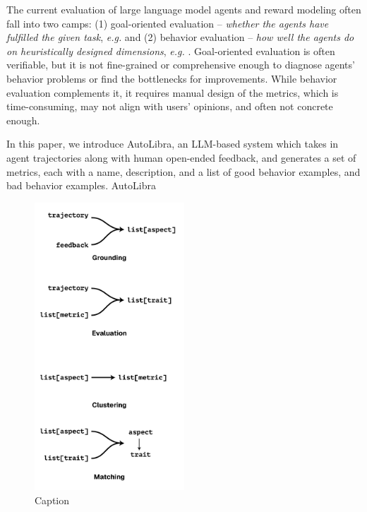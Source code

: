\documentclass{article} %
\begin{document}
The current evaluation of large language model agents and reward modeling often fall into two camps: (1) goal-oriented evaluation -- \emph{whether the agents have fulfilled the given task}, \emph{e.g.} \citet{zhouwebarena,jimenezswe,chan2024mle,paglieri2024balrog} and (2) behavior evaluation -- \emph{how well the agents do on heuristically designed dimensions}, \emph{e.g.} \citet{zhousotopia,shao2024collaborative,pan2025why}. 
Goal-oriented evaluation is often verifiable, but it is not fine-grained or comprehensive enough to diagnose agents' behavior problems or find the bottlenecks for improvements. 
While behavior evaluation complements it, it requires manual design of the metrics, which is time-consuming, may not align with users' opinions, and often not concrete enough. 

In this paper, we introduce AutoLibra, an LLM-based system which takes in agent trajectories along with human open-ended feedback, and generates a set of metrics, each with a name, description, and a list of good behavior examples, and bad behavior examples. AutoLibra 


\begin{figure}
    \centering
    \includegraphics[width=0.5\textwidth]{Template-2025/figs/autolibra-pipeline.pdf}
    \caption{Caption}
    \label{fig:enter-label}
\end{figure}
\end{document}
